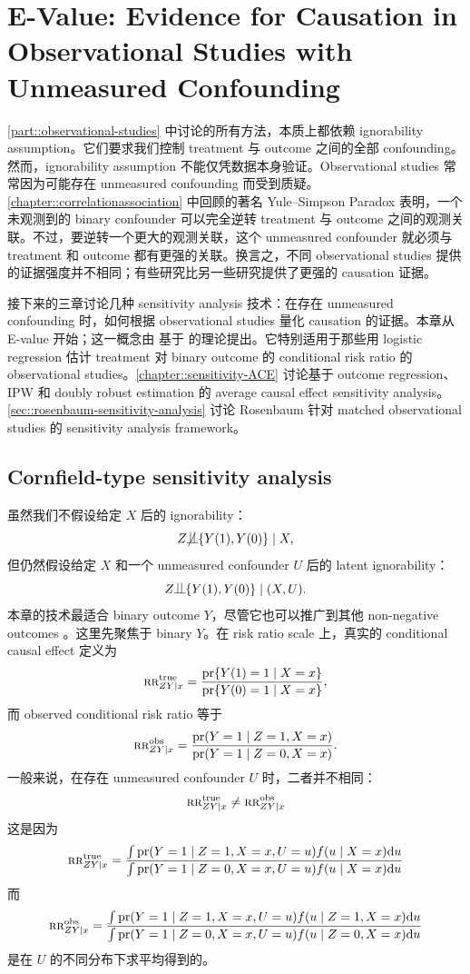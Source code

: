 
\chapter{E-Value: Evidence for Causation in Observational Studies with Unmeasured Confounding}
\label{chapter::evalue}


\cref{part::observational-studies} 中讨论的所有方法，本质上都依赖 ignorability assumption。它们要求我们控制 treatment 与 outcome 之间的全部 confounding。然而，ignorability assumption 不能仅凭数据本身验证。Observational studies 常常因为可能存在 unmeasured confounding 而受到质疑。\cref{chapter::correlationassociation} 中回顾的著名 Yule--Simpson Paradox 表明，一个未观测到的 binary confounder 可以完全逆转 treatment 与 outcome 之间的观测关联。不过，要逆转一个更大的观测关联，这个 unmeasured confounder 就必须与 treatment 和 outcome 都有更强的关联。换言之，不同 observational studies 提供的证据强度并不相同；有些研究比另一些研究提供了更强的 causation 证据。


接下来的三章讨论几种 sensitivity analysis 技术：在存在 unmeasured confounding 时，如何根据 observational studies 量化 causation 的证据。本章从 E-value 开始；这一概念由 \citet{vanderweele2017sensitivity} 基于 \citet{ding2016sensitivity} 的理论提出。它特别适用于那些用 logistic regression 估计 treatment 对 binary outcome 的 conditional risk ratio 的 observational studies。\cref{chapter::sensitivity-ACE} 讨论基于 outcome regression、IPW 和 doubly robust estimation 的 average causal effect sensitivity analysis。\cref{sec::rosenbaum-sensitivity-analysis} 讨论 Rosenbaum 针对 matched observational studies 的 sensitivity analysis framework。






\section{Cornfield-type sensitivity analysis}

虽然我们不假设给定 $X$ 后的 ignorability：
$$
Z\nind \{  Y(1), Y(0) \} \mid X ,
$$
但仍然假设给定 $X$ 和一个 unmeasured confounder $U$ 后的 latent ignorability：
$$
Z\ind \{  Y(1), Y(0) \} \mid (X, U) . 
$$
本章的技术最适合 binary outcome $Y$，尽管它也可以推广到其他 non-negative outcomes \citep{ding2016sensitivity}。这里先聚焦于 binary $Y$。在 risk ratio scale 上，真实的 conditional causal effect 定义为
$$
\textsc{rr}_{ZY\mid x}^{\textup{true}} = \frac{  \textup{pr}\{ Y(1) = 1\mid X=x  \} }{ \textup{pr}\{ Y(0) = 1\mid X=x  \} },
$$
而 observed conditional risk ratio 等于
$$
\textsc{rr}_{ZY\mid x}^{\textup{obs}} = \frac{  \textup{pr}( Y  = 1\mid Z=1, X=x  ) }{ \textup{pr}( Y  = 1\mid  Z=0, X=x  ) }.
$$
一般来说，在存在 unmeasured confounder $U$ 时，二者并不相同：
$$
\textsc{rr}_{ZY\mid x}^{\textup{true}}  \neq \textsc{rr}_{ZY\mid x}^{\textup{obs}} 
$$ 
这是因为
$$
\textsc{rr}_{ZY\mid x}^{\textup{true}} = \frac{  \int  \textup{pr}( Y = 1\mid Z=1, X=x, U=u  )  f(u \mid X=x) \textup{d} u }
{ \int \textup{pr}( Y = 1\mid Z=0,  X=x , U=u  )  f(u \mid X=x) \textup{d} u }
$$
而
$$
\textsc{rr}_{ZY\mid x}^{\textup{obs}} = \frac{ \int   \textup{pr}( Y  = 1\mid Z=1, X=x , U=u ) f(u \mid Z=1, X=x) \textup{d} u   }
{ \int  \textup{pr}( Y  = 1\mid  Z=0, X=x, U=u  ) f(u \mid Z=0, X=x) \textup{d} u  } 
$$
是在 $U$ 的不同分布下求平均得到的。


